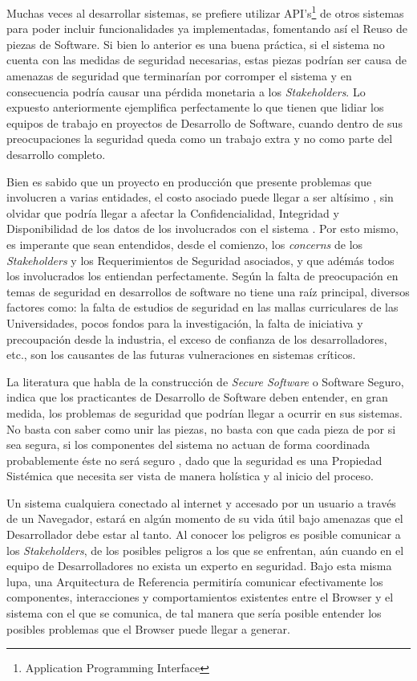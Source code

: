 Muchas veces al desarrollar sistemas, se prefiere utilizar API's\footnote{Application Programming Interface} de otros sistemas para poder incluir funcionalidades ya implementadas, fomentando así el Reuso de piezas de Software. Si bien lo anterior es una buena práctica, si el sistema no cuenta con las medidas de seguridad necesarias, estas piezas podrían ser causa de amenazas de seguridad que terminarían por corromper el sistema y en consecuencia podría causar una pérdida monetaria a los \textit{Stakeholders}. Lo expuesto anteriormente ejemplifica perfectamente lo que tienen que lidiar los equipos de trabajo en proyectos de Desarrollo de Software, cuando dentro de sus preocupaciones la seguridad queda como un trabajo extra y no como parte del desarrollo completo. 

Bien es sabido que un proyecto en producción que presente problemas que involucren a varias entidades, el costo asociado puede llegar a ser altísimo \cite{cert}, sin olvidar que podría llegar a afectar la Confidencialidad, Integridad y Disponibilidad de los datos de los involucrados con el sistema  \cite{interCoursera}. Por esto mismo, es imperante que sean entendidos, desde el comienzo, los \textit{concerns} de los \textit{Stakeholders} y los Requerimientos de Seguridad asociados, y que adémás todos los involucrados los entiendan perfectamente. Según \cite{WhyteHarrison} la falta de preocupación en temas de seguridad en desarrollos de software no tiene una raíz principal, diversos factores como: la falta de estudios de seguridad en las mallas curriculares de las Universidades, pocos fondos para la investigación, la falta de iniciativa y precoupación desde la industria, el exceso de confianza de los desarrolladores, etc., son los causantes de las futuras vulneraciones en sistemas críticos. 

La literatura que habla de la construcción de \textit{Secure Software} o Software Seguro, indica que los practicantes de Desarrollo de Software deben entender, en gran medida, los problemas de seguridad que podrían llegar a ocurrir en sus sistemas. No basta con saber como unir las piezas, no basta con que cada pieza de por si sea segura, si los componentes del sistema no actuan de forma coordinada probablemente éste no será seguro \cite{fernandez2013security}, dado que la seguridad es una Propiedad Sistémica que necesita ser vista de manera holística y al inicio del proceso.  

Un sistema cualquiera conectado al internet y accesado por un usuario a través de un Navegador, estará en algún momento de su vida útil bajo amenazas que el Desarrollador debe estar al tanto. Al conocer los peligros es posible comunicar a los \textit{Stakeholders}, de los posibles peligros a los que se enfrentan, aún cuando en el equipo de Desarrolladores no exista un experto en seguridad. Bajo esta misma lupa, una Arquitectura de Referencia permitiría comunicar efectivamente los componentes, interacciones y comportamientos existentes entre el Browser y el sistema con el que se comunica, de tal manera que sería posible entender los posibles problemas que el Browser puede llegar a generar. 

